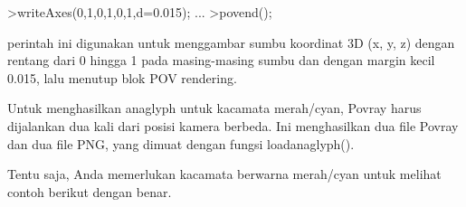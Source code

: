 \documentclass{article}
\begin{document}
\begin{eulernotebook}
\begin{eulercomment}
\begin{eulercomment}
\begin{eulercomment}
\begin{eulercomment}
\begin{eulercomment}
\begin{eulercomment}
\begin{eulercomment}
\begin{eulercomment}
\begin{eulercomment}
\begin{eulercomment}
\begin{eulercomment}
\begin{eulercomment}
\begin{eulercomment}
\begin{eulercomment}
\begin{eulercomment}
\begin{eulercomment}
\begin{eulerprompt}
>writeAxes(0,1,0,1,0,1,d=0.015); ...
>povend();
\end{eulerprompt}
\begin{eulercomment}
perintah ini digunakan untuk menggambar sumbu koordinat 3D (x, y, z)
dengan rentang dari 0 hingga 1 pada masing-masing sumbu dan dengan
margin kecil 0.015, lalu menutup blok POV rendering.

\begin{eulercomment}
\begin{eulercomment}
Untuk menghasilkan anaglyph untuk kacamata merah/cyan, Povray harus
dijalankan dua kali dari posisi kamera berbeda. Ini menghasilkan dua
file Povray dan dua file PNG, yang dimuat dengan fungsi
loadanaglyph().

Tentu saja, Anda memerlukan kacamata berwarna merah/cyan untuk melihat
contoh berikut dengan benar.


\end{eulercomment}
\end{eulercomment}
\end{eulercomment}
\end{eulercomment}
\end{eulercomment}
\end{eulercomment}
\end{eulercomment}
\end{eulercomment}
\end{eulercomment}
\end{eulercomment}
\end{eulercomment}
\end{eulercomment}
\end{eulercomment}
\end{eulercomment}
\end{eulercomment}
\end{eulercomment}
\end{eulercomment}
\end{eulercomment}
\end{eulercomment}
\end{eulernotebook}
\end{document}
